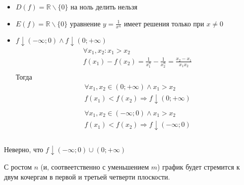 \begin{itemize}
    \item $D(f) = \mathbb{R} \backslash \{0\}$
    на ноль делить нельзя
    \item $E(f) = \mathbb{R} \backslash \{0\}$
    уравнение $y = \frac{1}{x^n}$ имеет решения только при $x \neq 0$ 
    \item $f \downarrow (-\infty; 0) \land f \downarrow (0; +\infty)$
    \begin{align*}
        &\forall x_1, x_2 : x_1 > x_2 \\
        &f(x_1) - f(x_2) = \frac{1}{x_1^n} - \frac{1}{x_2^n} = \frac{x_2 - x_1}{x_1x_2}\\
    \end{align*}
    Тогда
    \begin{align*}
        &\forall x_1, x_2 \in (0; +\infty) \land x_1 > x_2 \\
        &f(x_1) < f(x_2) \Rightarrow f \downarrow (0; +\infty) \\ \\
        &\forall x_1, x_2 \in (-\infty; 0) \land x_1 > x_2 \\
        &f(x_1) < f(x_2) \Rightarrow f \downarrow (-\infty; 0) \\ \\
    \end{align*}
\end{itemize}

\begin{remark}
    Неверно, что $f \downarrow (-\infty; 0) \cup (0; +\infty)$
\end{remark}

\begin{remark}
    С ростом $n$ (и, соотвеетственно с уменьшением $m$) график будет стремится к двум кочергам в первой и третьей четверти плоскости.
\end{remark}

